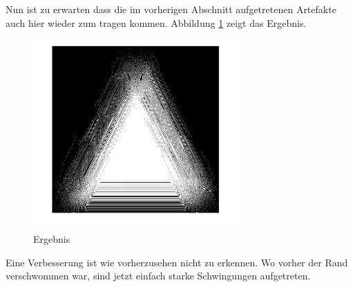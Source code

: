Nun ist zu erwarten dass die im vorherigen Abschnitt aufgetretenen Artefakte auch hier wieder zum tragen kommen.
Abbildung \ref{deconvolve:ergebnis} zeigt das Ergebnis.
\begin{figure}[h]
\centering
\includegraphics[width=0.7\textwidth]{./papers/deconvolve/pictures/dreieck_sharp.png}
\caption{Ergebnis\label{deconvolve:ergebnis}}
\end{figure}
 
Eine Verbesserung ist wie vorherzusehen nicht zu erkennen. Wo vorher der Rand verschwommen war, sind jetzt einfach starke Schwingungen aufgetreten.
